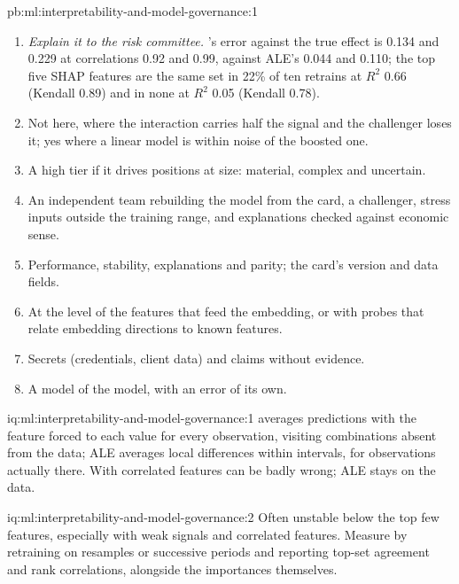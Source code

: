 \begin{solution}{pb:ml:interpretability-and-model-governance:1}
\begin{enumerate}[resume]
\item \emph{Explain it to the risk committee.} 's error against the true effect is 0.134 and 0.229 at
correlations 0.92 and 0.99, against ALE's 0.044 and 0.110; the top five SHAP features are the same set in 22\% of ten retrains
at $R^2$ 0.66 (Kendall 0.89) and in none at $R^2$ 0.05 (Kendall 0.78).
\item Not here, where the interaction carries half the signal and the challenger loses it; yes where a linear model is within
noise of the boosted one.
\item A high tier if it drives positions at size: material, complex and uncertain.
\item An independent team rebuilding the model from the card, a challenger, stress inputs outside the training range, and
explanations checked against economic sense.
\item Performance, stability, explanations and parity; the card's version and data fields.
\item At the level of the features that feed the embedding, or with probes that relate embedding directions to known features.
\item Secrets (credentials, client data) and claims without evidence.
\item A model of the model, with an error of its own.
\end{enumerate}
\end{solution}

\begin{solution}{iq:ml:interpretability-and-model-governance:1}
 averages predictions with the feature forced to each value for every observation, visiting combinations
absent from the data; ALE averages local differences within intervals, for observations actually there. With correlated
features  can be badly wrong; ALE stays on the data.
\end{solution}

\begin{solution}{iq:ml:interpretability-and-model-governance:2}
Often unstable below the top few features, especially with weak signals and correlated features. Measure by retraining on
resamples or successive periods and reporting top-set agreement and rank correlations, alongside the importances themselves.
\end{solution}

